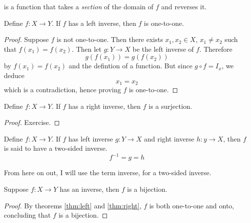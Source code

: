 \documentclass[11pt]{article}
\numberwithin{lemma}{section}
\numberwithin{equation}{section}
\numberwithin{define}{section}
\numberwithin{prop}{section}
\numberwithin{figure}{section}
\numberwithin{theorem}{section}
\newcounter{ex}[section]
\numberwithin{ex}{section}
\begin{document}
\begin{figure}[h]
\centering
{}
	\caption{}
	\label{fig:right}
\end{figure}
is a function that takes a \textit{section} of the domain of $f$ and reverses it.

\begin{theorem}
\label{thm:left}
Define $f:X\to Y$. If $f$ has a left inverse, then $f$ is one-to-one.	
\end{theorem}
\begin{proof}
	Suppose $f$ is not one-to-one. Then there exists $x_1,x_2\in X$, $x_1\neq x_2$ such that $f(x_1)=f(x_2)$. Then let $g:Y\to X$ be the left inverse of $f$. Therefore
	$$g(f(x_1))=g(f(x_2))$$
	by $f(x_1)=f(x_2)$ and the defintion of a function.
	But since $g\circ f=I_x$, we deduce
	$$x_1=x_2$$
	which is a contradiction, hence proving $f$ is one-to-one.
\end{proof}

\begin{theorem}
\label{thm:right}
Define $f:X\to Y$. If $f$ has a right inverse, then $f$ is a surjection.
\end{theorem}
\begin{proof}
Exercise.	
\end{proof}

\begin{define}
	Define $f:X\to Y$. If $f$ has left inverse $g:Y\to X$ and right inverse $h:y\to X$, then $f$ is said to have a two-sided inverse.
	$$f^{-1}=g=h$$
\end{define}
From here on out, I will use the term inverse, for a two-sided inverse.
\begin{theorem}
\label{thm:bi}
Suppose $f:X\to Y$ has an inverse, then $f$ is a bijection.
\end{theorem}
\begin{proof}
	By theorems \eqref{thm:left} and \eqref{thm:right}, $f$ is both one-to-one and onto, concluding that $f$ is a bijection.
\end{proof}
\end{document}
